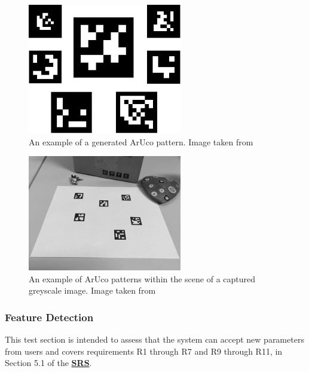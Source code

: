\documentclass[12pt, titlepage]{article}
\begin{document}
\begin{figure}[h!]
  \begin{center}
   \includegraphics[width=0.6\textwidth]{images/ArUco_Field_Gen.jpg}
  \caption{An example of a generated ArUco pattern. Image taken from \cite{ARUCO_Markers_openCV}}
  \label{gen_aruco} 
  \end{center}
\end{figure}

\begin{figure}[h!]
  \begin{center}
   \includegraphics[width=0.6\textwidth]{images/GS_ArUco_Field_Image.jpg}
  \caption{An example of ArUco patterns within the scene of a captured greyscale image. 
  Image taken from \cite{ARUCO_Markers_openCV}}
  \label{gs_aruco_field} 
  \end{center}
\end{figure}

\subsubsection{Feature Detection}
This test section is intended to assess that the system can accept new parameters from users and covers 
requirements R1 through R7 and R9 through R11, in Section 5.1 of the 
\textbf{\href{https://github.com/KiranSingh15/CAS-741-Image-Correspondences/blob/main/docs/SRS/SRS.pdf}
{SRS}}. 
		
\end{document}
